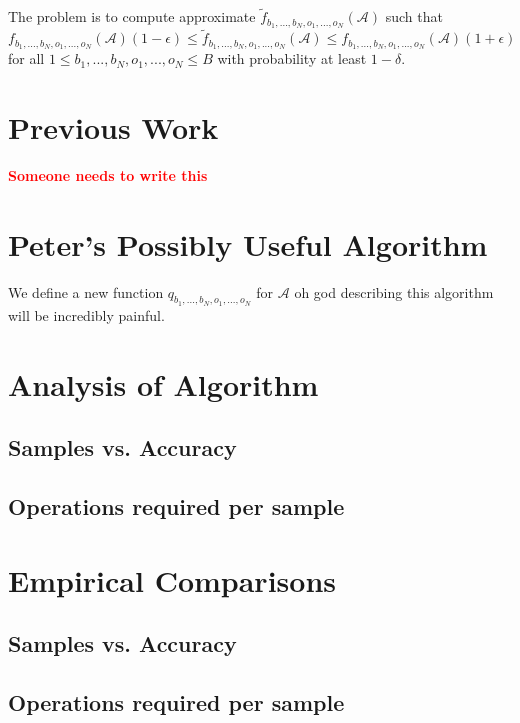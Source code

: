 \documentclass[12pt]{article}
\newcommand{\todo}[1] {\textbf{\textcolor{red}{#1}}}
\newcommand{\Ten}[1] {\mathbf{\mathcal{#1}}}
\begin{document}
    The problem is to compute approximate $\tilde{f}_{b_1, ..., b_N, o_1, ..., o_N}(\Ten{A})$ such that $f_{b_1, ..., b_N, o_1, ..., o_N}(\Ten{A})(1 - \epsilon) \leq \tilde{f}_{b_1, ..., b_N, o_1, ..., o_N}(\Ten{A}) \leq f_{b_1, ..., b_N, o_1, ..., o_N}(\Ten{A})(1 + \epsilon)$ for all $1 \leq b_1, ..., b_N, o_1, ..., o_N \leq B$ with probability at least $1 - \delta$.
  \section{Previous Work}
    \todo{Someone needs to write this}

  \section{Peter's Possibly Useful Algorithm}

    We define a new function $q_{b_1, ..., b_N, o_1, ..., o_N}$ for $\Ten{A}$
    oh god describing this algorithm will be incredibly painful.


  \section{Analysis of Algorithm}
    \subsection{Samples vs. Accuracy}
    \subsection{Operations required per sample}
  
  \section{Empirical Comparisons}
    \subsection{Samples vs. Accuracy}
    \subsection{Operations required per sample}
\end{document}
